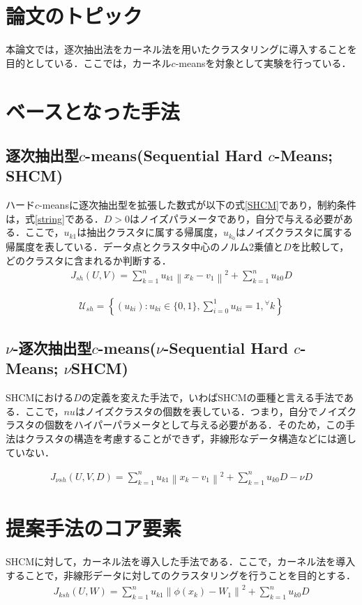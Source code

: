 \documentclass[10pt,onecolumn]{jsarticle}
\begin{document}
\section{論文のトピック}
本論文では，逐次抽出法をカーネル法を用いたクラスタリングに導入することを目的としている．ここでは，カーネル$c$-meansを対象として実験を行っている．

\section{ベースとなった手法}
\subsection{逐次抽出型$c$-means(Sequential Hard $c$-Means; SHCM)}
ハード$c$-meansに逐次抽出型を拡張した数式が以下の式\eqref{SHCM}であり，制約条件は，式\eqref{string}である．$D>0$はノイズパラメータであり，自分で与える必要がある．ここで，$u_{k 1}$は抽出クラスタに属する帰属度，$u_{k_0}$はノイズクラスタに属する帰属度を表している．データ点とクラスタ中心のノルム2乗値と$D$を比較して，どのクラスタに含まれるか判断する．
\begin{align}
	J_{s h}(U, V)=\sum_{k=1}^{n} u_{k 1}\left\|x_{k}-v_{1}\right\|^{2}+\sum_{k=1}^{n} u_{k 0} D
	\label{SHCM}
\end{align}

\begin{align}
		\mathcal{U}_{s h}=\left\{\left(u_{k i}\right): u_{k i} \in\{0,1\}, \sum_{i=0}^{1} u_{k i}=1,{ }^{\forall} k\right\}
		\label{string}
\end{align}

\subsection{$\nu$-逐次抽出型$c$-means($\nu$-Sequential Hard $c$-Means; $\nu$SHCM)}
SHCMにおける$D$の定義を変えた手法で，いわばSHCMの亜種と言える手法である．ここで，$nu$はノイズクラスタの個数を表している．つまり，自分でノイズクラスタの個数をハイパーパラメータとして与える必要がある．そのため，この手法はクラスタの構造を考慮することができず，非線形なデータ構造などには適していない．

\begin{align}
	J_{\nu s h}(U, V, D)=\sum_{k=1}^{n} u_{k 1}\left\|x_{k}-v_{1}\right\|^{2}+\sum_{k=1}^{n} u_{k 0} D-\nu D
	\label{nuSHCM}
\end{align}

\section{提案手法のコア要素}
SHCMに対して，カーネル法を導入した手法である．ここで，カーネル法を導入することで，非線形データに対してのクラスタリングを行うことを目的とする．
\begin{align}
	J_{k s h}(U, W)=\sum_{k=1}^{n} u_{k 1}\left\|\phi\left(x_{k}\right)-W_{1}\right\|^{2}+\sum_{k=1}^{n} u_{k 0} D
\end{align}
\end{document}
